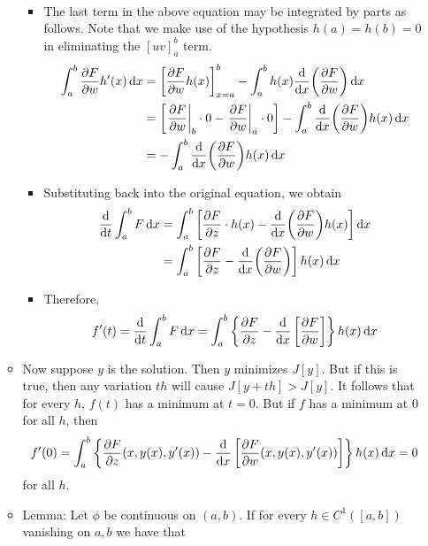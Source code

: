 \documentclass[../notes.tex]{subfiles}
\begin{document}
\begin{itemize}
\begin{itemize}
\begin{align*}
        \end{align*}
        \begin{itemize}
            \item The last term in the above equation may be integrated by parts as follows. Note that we make use of the hypothesis $h(a)=h(b)=0$ in eliminating the $[uv]_a^b$ term.
            \begin{align*}
                \int_a^b\pdv{F}{w}h'(x)\dd{x} &= \left[ \pdv{F}{w}h(x) \right]_{x=a}^b-\int_a^bh(x)\dv{x}(\pdv{F}{w})\dd{x}\\
                &= \left[ \eval{\pdv{F}{w}}_b\cdot 0-\eval{\pdv{F}{w}}_a\cdot 0 \right]-\int_a^b\dv{x}(\pdv{F}{w})h(x)\dd{x}\\
                &= -\int_a^b\dv{x}(\pdv{F}{w})h(x)\dd{x}
            \end{align*}
            \item Substituting back into the original equation, we obtain
            \begin{align*}
                \dv{t}\int_a^bF\dd{x} &= \int_a^b\left[ \pdv{F}{z}\cdot h(x)-\dv{x}(\pdv{F}{w})h(x) \right]\dd{x}\\
                &= \int_a^b\left[ \pdv{F}{z}-\dv{x}(\pdv{F}{w}) \right]h(x)\dd{x}
            \end{align*}
            \item Therefore,
            \begin{equation*}
                f'(t) = \dv{t}\int_a^bF\dd{x}
                = \int_a^b\left\{ \pdv{F}{z}(x,y(x)+th(x),y'(x)+th'(x))-\dv{x}\left[ \pdv{F}{w}(x,y(x)+th(x),y'(x)+th'(x)) \right] \right\}h(x)\dd{x}
            \end{equation*}
        \end{itemize}
        \item Now suppose $y$ is the solution. Then $y$ minimizes $J[y]$. But if this is true, then any variation $th$ will cause $J[y+th]>J[y]$. It follows that for every $h$, $f(t)$ has a minimum at $t=0$. But if $f$ has a minimum at 0 for all $h$, then
        \begin{equation*}
            f'(0) = \int_a^b\left\{ {\pdv{F}{z}}(x,y(x),y'(x))-\dv{x}\left[ {\pdv{F}{w}}(x,y(x),y'(x)) \right] \right\}h(x)\dd{x}
            = 0
        \end{equation*}
        for all $h$.
        \item Lemma: Let $\phi$ be continuous on $(a,b)$. If for every $h\in C^1([a,b])$ vanishing on $a,b$ we have that

\end{itemize}
\end{itemize}
\end{document}
